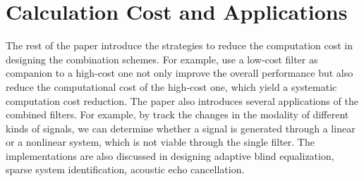 \documentclass[11pt]{article}
\begin{document}
\section{Calculation Cost and Applications}
The rest of the paper introduce the strategies to reduce the computation cost in designing the combination schemes. For example, use a low-cost filter as companion to a high-cost one not only improve the overall performance but also reduce the computational cost of the high-cost one, which yield a systematic computation cost reduction. The paper also introduces several applications of the combined filters. For example, by track the changes in the modality of different kinds of signals, we can determine whether a signal is generated through a linear or a nonlinear system, which is not viable through the single filter. The implementations are also discussed in designing adaptive blind equalization, sparse system identification, acoustic echo cancellation. 

\printbibliography
\end{document}
